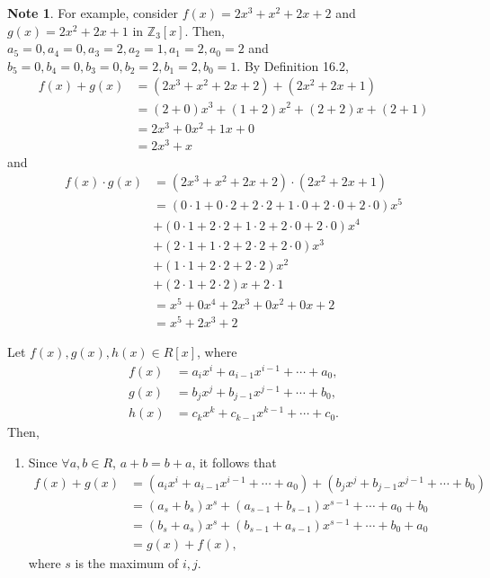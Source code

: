 \documentclass{article}
\theoremstyle{definition}
\newtheorem{note}{Note}[section]
\begin{document}
\begin{note}
    For example, consider $f(x)=2x^3+x^2+2x+2$ and $g(x)=2x^2+2x+1$ in $\mathbb{Z}_3[x]$. Then, $a_5=0, a_4=0, a_3=2, a_2=1, a_1=2, a_0=2$ and $b_5=0, b_4=0, b_3=0, b_2=2, b_1=2, b_0=1$. By Definition 16.2,
    \begin{align*}
        f(x)+g(x)&=(2x^3+x^2+2x+2)+(2x^2+2x+1) \\
        &=(2+0)x^3+(1+2)x^2+(2+2)x+(2+1) \\
        &=2x^3+0x^2+1x+0 \\
        &=2x^3+x
    \end{align*}
    and
    \begin{align*}
        f(x)\cdot g(x)&=(2x^3+x^2+2x+2)\cdot(2x^2+2x+1) \\
        &=(0\cdot1 + 0\cdot2 + 2\cdot2 + 1\cdot0 + 2\cdot0 + 2\cdot0)x^5 \\
        &+(0\cdot1 + 2\cdot2 + 1\cdot2 + 2\cdot0 + 2\cdot0)x^4 \\
        &+(2\cdot1 + 1\cdot2 + 2\cdot2 + 2\cdot0)x^3 \\
        &+(1\cdot1 + 2\cdot2 + 2\cdot2)x^2 \\
        &+(2\cdot1 + 2\cdot2)x + 2\cdot1 \\
        &=x^5+0x^4+2x^3+0x^2+0x+2 \\
        &=x^5+2x^3+2
    \end{align*}
    
    Let $f(x),g(x),h(x)\in R[x]$, where
    \begin{align*}
        f(x)&=a_ix^i+a_{i-1}x^{i-1}+\cdots+a_0, \\
        g(x)&=b_jx^j+b_{j-1}x^{j-1}+\cdots+b_0, \\
        h(x)&=c_kx^k+c_{k-1}x^{k-1}+\cdots+c_0.
    \end{align*}
    Then,
    \begin{enumerate} 
        \item Since $\forall a,b\in R$, $a+b=b+a$, it follows that
        \begin{align*}
            f(x)+g(x)&=(a_ix^i+a_{i-1}x^{i-1}+\cdots+a_0) + (b_jx^j+b_{j-1}x^{j-1}+\cdots+b_0) \\
            &=(a_s+b_s)x^s+(a_{s-1}+b_{s-1})x^{s-1}+\cdots+a_0+b_0 \\
            &=(b_s+a_s)x^s+(b_{s-1}+a_{s-1})x^{s-1}+\cdots+b_0+a_0 \\
            &=g(x)+f(x),
        \end{align*}
        where $s$ is the maximum of $i,j$. 
        

\end{enumerate}
\end{note}
\end{document}
